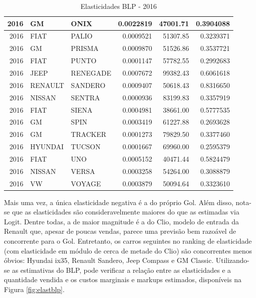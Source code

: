 \documentclass{article}
\begin{document}
\begin{table}[H]
\begin{tabular}{r|l|l|r|r|r}
\hline
2016 & GM & ONIX & 0.0022819 & 47001.71 & 0.3904088\\
\hline
2016 & FIAT & PALIO & 0.0009521 & 51307.85 & 0.3239371\\
\hline
2016 & GM & PRISMA & 0.0009870 & 51526.86 & 0.3537721\\
\hline
2016 & FIAT & PUNTO & 0.0001147 & 57782.55 & 0.2992683\\
\hline
2016 & JEEP & RENEGADE & 0.0007672 & 99382.43 & 0.6061618\\
\hline
2016 & RENAULT & SANDERO & 0.0009407 & 50618.43 & 0.8316650\\
\hline
2016 & NISSAN & SENTRA & 0.0000936 & 83199.83 & 0.3357919\\
\hline
2016 & FIAT & SIENA & 0.0004981 & 38661.00 & 0.5777535\\
\hline
2016 & GM & SPIN & 0.0003419 & 61227.88 & 0.2693628\\
\hline
2016 & GM & TRACKER & 0.0001273 & 79829.50 & 0.3377460\\
\hline
2016 & HYUNDAI & TUCSON & 0.0001667 & 69960.00 & 0.2595379\\
\hline
2016 & FIAT & UNO & 0.0005152 & 40471.44 & 0.5824479\\
\hline
2016 & NISSAN & VERSA & 0.0003258 & 54264.00 & 0.3088879\\
\hline
2016 & VW & VOYAGE & 0.0003879 & 50094.64 & 0.3323610\\
\hline
\end{tabular}
    \caption{Elasticidades BLP - 2016}
    \label{tab:elastBLP}
\end{table}

Mais uma vez, a única elasticidade negativa é a do próprio Gol. Além disso, nota-se que as elasticidades são consideravelmente maiores do que as estimadas via Logit. Dentre todas, a de maior magnitude é a do Clio, modelo de entrada da Renault que, apesar de poucas vendas, parece uma previsão bem razoável de concorrente para o Gol. Entretanto, os carros seguintes no ranking de elasticidade (com elasticidade em módulo de cerca de metade do Clio) são concorrentes menos óbvios: Hyundai ix35, Renault Sandero, Jeep Compass e GM Classic. Utilizando-se as estimativas do BLP, pode verificar a relação entre as elasticidades e a quantidade vendida e os custos marginais e markups estimados, disponíveis na Figura \ref{fig:elastblp}.
\end{document}
